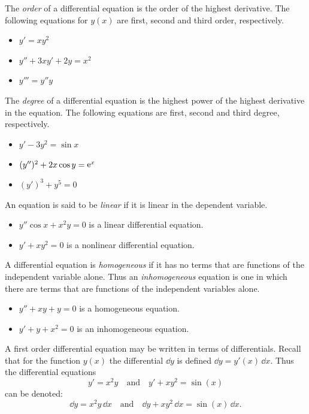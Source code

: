The \textit{order} of a differential equation is the order of the highest 
derivative.
The following equations for $y(x)$ are first, second and third order, 
respectively.
\begin{itemize}
\item $y' = x y^2$
\item $y'' + 3 x y' + 2 y = x^2$
\item $y''' = y'' y$
\end{itemize}

The \textit{degree} of a differential equation is the highest power of 
the highest
derivative in the equation.  The following equations are first, second 
and third degree, respectively.
\begin{itemize}
\item $y' - 3 y^2 = \sin x$
\item $(y'')^2 + 2 x \cos y = \mathop{\mathrm{e}}\nolimits^x$
\item $(y')^3 + y^5 = 0$
\end{itemize}
An equation is said to be \textit{linear} if it is linear in the dependent 
variable.
\begin{itemize}
\item $y'' \cos x + x^2 y = 0$ is a linear differential equation.
\item $y' + x y^2 = 0$ is a nonlinear differential equation.
\end{itemize}

A differential equation is \textit{homogeneous} if it has no terms that 
are functions of the
independent variable alone.  Thus an \textit{inhomogeneous} equation is one in
which there are terms that are functions of the independent variables alone.
\begin{itemize}
\item $y'' + x y + y = 0$ is a homogeneous equation.
\item $y' + y + x^2 = 0$ is an inhomogeneous equation.
\end{itemize}


A first order differential equation may be written in terms of differentials.
Recall that for the function $y(x)$ the differential $\dd y$ is defined
$\dd y = y'(x)\,\dd x$.  Thus the differential equations
\[
y' = x^2 y \quad \mathrm{and} \quad y' + x y^2 = \sin(x)
\]
can be denoted:
\[
\dd y = x^2 y \,\dd x \quad \mathrm{and} \quad 
\dd y + x y^2 \,\dd x = \sin(x) \,\dd x.
\]


